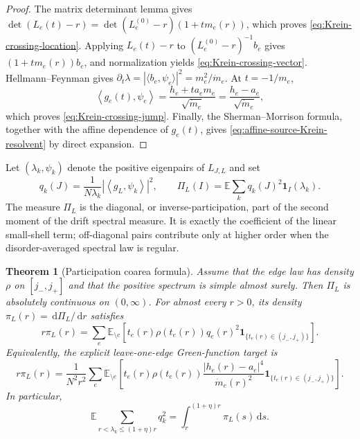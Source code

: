 \documentclass[11pt]{article}
\newtheorem{theorem}{Theorem}[section]
\theoremstyle{definition}
\theoremstyle{remark}
\newcommand{\E}{\mathbb E}
\newcommand{\ip}[2]{\left\langle #1,#2\right\rangle}
\newcommand{\abs}[1]{\left\lvert #1\right\rvert}
\newcommand{\dd}{\,\mathrm d}
\begin{document}
\begin{proof}
The matrix determinant lemma gives
$\det(L_e(t)-r)=\det(L_e^{(0)}-r)(1+tm_e(r))$, which proves
\eqref{eq:Krein-crossing-location}.  Applying $L_e(t)-r$ to
$(L_e^{(0)}-r)^{-1}b_e$ gives $(1+tm_e(r))b_e$, and normalization yields
\eqref{eq:Krein-crossing-vector}.  Hellmann--Feynman gives
$\partial_t\lambda=|\langle b_e,\psi_e\rangle|^2=m_e^2/\dot m_e$.
At $t=-1/m_e$,
\[
 \ip{g_e(t)}{\psi_e}
 =\frac{h_e+ta_em_e}{\sqrt{\dot m_e}}
 =\frac{h_e-a_e}{\sqrt{\dot m_e}},
\]
which proves \eqref{eq:Krein-crossing-jump}.  Finally, the
Sherman--Morrison formula, together with the affine dependence of $g_e(t)$,
gives \eqref{eq:affine-source-Krein-resolvent} by direct expansion.
\end{proof}

Let $(\lambda_k,\psi_k)$ denote the positive eigenpairs of $L_{J,L}$ and set
\begin{equation}
 q_k(J)=\frac1{N\lambda_k}\abs{\ip{g_L}{\psi_k}}^2,
 \qquad
 \Pi_L(I)=\E\sum_kq_k(J)^2\bm1_I(\lambda_k).
 \label{eq:participation-measure}
\end{equation}
The measure $\Pi_L$ is the diagonal, or inverse-participation, part of the
second moment of the drift spectral measure.  It is exactly the coefficient
of the linear small-shell term; off-diagonal pairs contribute only at higher
order when the disorder-averaged spectral law is regular.

\begin{theorem}[Participation coarea formula]
\label{thm:participation-coarea}
Assume that the edge law has density $\rho$ on $[j_-,j_+]$ and that the
positive spectrum is simple almost surely.  Then $\Pi_L$ is absolutely
continuous on $(0,\infty)$.  For almost every $r>0$, its density
$\pi_L(r)=\dd\Pi_L/\dd r$ satisfies
\begin{equation}
 \boxed{
 r\pi_L(r)=
 \sum_e\E_{\setminus e}\left[
 t_e(r)\rho(t_e(r))q_e(r)^2
 \bm1_{\{t_e(r)\in(j_-,j_+)\}}
 \right].}
 \label{eq:participation-coarea-density}
\end{equation}
Equivalently, the explicit leave-one-edge Green-function target is
\begin{equation}
 r\pi_L(r)=\frac1{N^2r^2}
 \sum_e\E_{\setminus e}\left[
 t_e(r)\rho(t_e(r))
 \frac{\abs{h_e(r)-a_e}^4}{\dot m_e(r)^2}
 \bm1_{\{t_e(r)\in(j_-,j_+)\}}
 \right].
 \label{eq:participation-Green-target}
\end{equation}
In particular,
\begin{equation}
 \E\sum_{r<\lambda_k\le(1+\eta)r}q_k^2
 =\int_r^{(1+\eta)r}\pi_L(s)\dd s.
 \label{eq:diagonal-shell-participation}
\end{equation}
\end{theorem}
\end{document}
